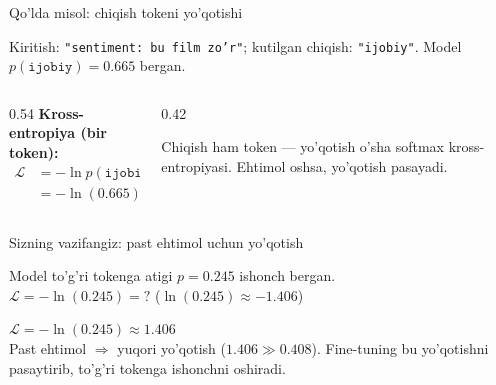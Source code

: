 \documentclass[aspectratio=169,11pt]{beamer}
\begin{document}
\begin{frame}{Qo'lda misol: chiqish tokeni yo'qotishi}
  \begin{tcolorbox}[defbox,title={Sentiment matn$\to$matn}]
    \small Kiritish: \texttt{"sentiment: bu film zo'r"}; kutilgan chiqish:
    \texttt{"ijobiy"}. Model $p(\texttt{ijobiy})=0.665$ bergan.
  \end{tcolorbox}
  \vspace{0.2em}
  \begin{columns}[T]
    \begin{column}{0.54\textwidth}
      \textbf{Kross-entropiya (bir token):}
      \begin{align*}
        \mathcal{L} &= -\ln p(\texttt{ijobiy})\\
          &= -\ln(0.665) \approx \mathbf{0.408}
      \end{align*}
    \end{column}
    \begin{column}{0.42\textwidth}
      \begin{tcolorbox}[okbox,top=2pt,bottom=2pt]
        \footnotesize
        Chiqish ham token --- yo'qotish o'sha softmax kross-entropiyasi.
        Ehtimol oshsa, yo'qotish pasayadi.
      \end{tcolorbox}
    \end{column}
  \end{columns}
\end{frame}

\begin{frame}{Sizning vazifangiz: past ehtimol uchun yo'qotish}
  \begin{tcolorbox}[warnbox,title=Savol --- 60 soniya]
    \small
    Model to'g'ri tokenga atigi $p=0.245$ ishonch bergan.\\[4pt]
    \textbf{\large $\mathcal{L} = -\ln(0.245) = ?$} \quad
    \footnotesize ($\ln(0.245)\approx -1.406$)
  \end{tcolorbox}
  \pause
  \begin{tcolorbox}[okbox,title=Javob]
    \small
    $\mathcal{L} = -\ln(0.245) \approx \mathbf{1.406}$\\[3pt]
    \footnotesize Past ehtimol $\Rightarrow$ yuqori yo'qotish ($1.406 \gg 0.408$).
    Fine-tuning bu yo'qotishni pasaytirib, to'g'ri tokenga ishonchni oshiradi.
  \end{tcolorbox}
\end{frame}
\end{document}
